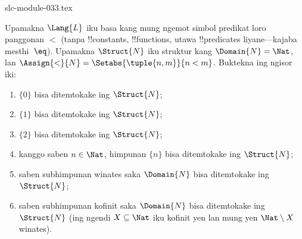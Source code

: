 \begin{filecontents*}[overwrite]{slc-module-033.tex}
\begin{prob}
Upamakna $\Lang{L}$ iku basa kang mung ngemot
simbol predikat loro panggonan $<$ (tanpa
!!{constant}s, !!{function}s, utawa !!{predicate}s
liyane---kajaba mesthi~$\eq$). Upamakna
$\Struct{N}$ iku struktur kang
$\Domain{N} = \Nat$, lan
$\Assign{<}{N} = \Setabs{\tuple{n,m}}{n <
  m}$. Buktekna ing ngisor iki:
\begin{enumerate}
\item $\{ 0 \}$ bisa ditemtokake ing $\Struct{N}$;
\item $\{ 1 \}$ bisa ditemtokake ing $\Struct{N}$;
\item $\{ 2 \}$ bisa ditemtokake ing $\Struct{N}$;
\item kanggo saben $n \in \Nat$, himpunan
  $\{ n \}$ bisa ditemtokake ing $\Struct{N}$;
\item saben subhimpunan winates saka $\Domain{N}$
  bisa ditemtokake ing $\Struct{N}$;
\item saben subhimpunan kofinit saka $\Domain{N}$
  bisa ditemtokake ing $\Struct{N}$
  (ing ngendi $X \subseteq \Nat$ iku kofinit
  yen lan mung yen $\Nat \setminus X$ winates).
\end{enumerate}
\end{prob}



\end{filecontents*}

